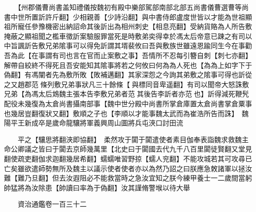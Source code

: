 　　【州郡儀曹尚書盖知禮儀按魏初有殿中樂部駕部南部北部五尚書儀曹選曹等尚書中世所置訢許斤翻】少相親善【少詩沿翻】與中書侍郎盧度世皆以才能為世祖顯祖所寵任參豫機密出納詔命其後訢出為相州刺史【相息亮翻】受納貨賂為人所告敷掩蔽之顯祖聞之檻車徵訢案驗服罪當死是時敷弟奕得幸於馮太后帝意已踈之有司以中旨諷訢告敷兄弟隂事可以得免訢謂其壻裴攸曰吾與敷族世雖遠恩踰同生今在事勸吾為此【在事謂有司也言在官而止案敷之事】吾情所不忍每引簪自刺【刺七亦翻】解帶自絞終不得死且吾安能知其隂事將若之何攸曰何為為人死也【為為上如字下于偽翻】有馮闡者先為敷所敗【敗補邁翻】其家深怨之今詢其弟敷之隂事可得也訢從之又趙郡范條列敷兄弟事狀凡三十餘條【與標同音卑遥翻】有司以聞帝大怒誅敷兄弟【為馮太后鴆魏主張本告李敷兄弟者范其後告李訢者亦范也】訢得減死鞭髠配役未幾復為太倉尚書攝南部事【魏中世分殿中尚書所掌倉庫置太倉尚書掌倉粟事也幾居豈翻復狀又翻】敷順之子也【李順以才能事魏太武而為崔浩所告而誅】　魏陽平王新成卒是歲命龍驤將軍義興周山圖將兵屯浹口討田流

　　平之【驤思將翻浹即協翻】　柔然攻于闐于闐遣使者素目伽奉表詣魏求救魏主命公卿議之皆曰于闐去京師幾萬里【北史曰于闐國去代九千八百里闐徒賢翻又堂見翻使疏吏翻伽求迦翻幾居希翻】蠕蠕唯習野掠【蠕人兖翻】不能攻城若其可攻尋已亡矣雖欲遣師勢無所及魏主以議示使者使者亦以為然乃詔之曰朕應急敇諸軍以拯汝難【難乃旦翻】但去汝遐阻必不能救當時之急汝宜知之朕今練甲養士一二歲間當躬帥猛將為汝除患【帥讀曰率為于偽翻】汝其謹脩警堠以待大舉

　　資治通鑑卷一百三十二


    


 


 



 

 
  







 


　　
　　
　
　
　


　　

　















	
	









































